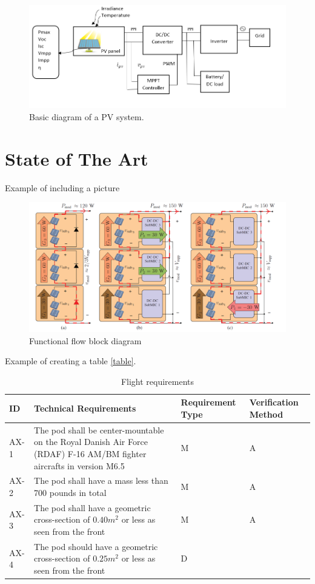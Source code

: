 \begin{figure}[htbp]
	\includegraphics[width=\linewidth]{../Pictures/PV_system_blocks}
	\caption{Basic diagram of a PV system.}
	\label{fig:PVsystemblocks}
\end{figure}


\newpage
\section{State of The Art}

Example of including a picture
\begin{figure}[htbp]
	\includegraphics[width=\linewidth]{../Pictures/test.png}
	\caption{Functional flow block diagram}
	\label{fig:TimePlan}
\end{figure}

Example of creating a table \ref{table}.
\begin{table}[htbp]
	\begin{tabular}{|m{1.5cm}|m{8cm}|m{2.5cm}|m{2.5cm}|}
		\hline
		\rowcolor{lightgray} \textbf{ID} & \textbf{Technical Requirements}  & \textbf{Requirement Type}  &  \textbf{Verification Method}    \\ \hline
		AX-1 & The pod shall be center-mountable on the Royal Danish Air Force (RDAF) F-16 AM/BM fighter aircrafts in version M6.5     & M   & A      \\ \hline
		\rowcolor{Seashell2} AX-2 & The pod shall have a mass less than 700 pounds in total & M  & A        \\ \hline
		AX-3 & The pod shall have a geometric cross-section of $0.40m^2$  or less as seen from the front   &  M   & A                \\ \hline
		\rowcolor{Seashell2} AX-4 & The pod should have a geometric cross-section of $0.25m^2$ or less as seen from the front   &  D   &                \\ \hline
	\end{tabular}
	\caption{Flight requirements}
	\label{tab:TechRequirements}
\end{table}




